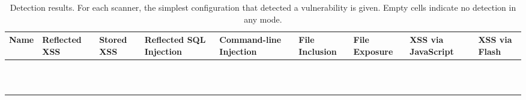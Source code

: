   \begin{table}[t]
    \centering
    {\scriptsize
      \begin{tabular}{|l|p{11ex}|p{11ex}|p{11ex}|p{11ex}|p{11ex}|p{11ex}|p{11ex}|p{11ex}|}
        \hline
        Name & Reflected XSS  & Stored XSS & \parbox[t]{11ex}{\raggedright Reflected SQL Injection} & \parbox[t]{11ex}{\raggedright Command-line Injection } & \parbox[t]{11ex}{\raggedright File Inclusion } & \parbox[t]{11ex}{\raggedright File Exposure } & \parbox[t]{11ex}{\raggedright XSS via JavaScript } & \parbox[t]{11ex}{\raggedright XSS via Flash }\\
        \hline
        \acunetix{} & \initial{} & \initial{} & \initial{} &  & \initial{} & \initial{} & \initial{} & \\
        \appscan{} & \initial{} & \initial{} & \initial{} &  & \initial{} & \initial{} &  &  \\
        \burp{} & \initial{} & \manual{} & \initial{} & \initial{} &  & \initial{} &  & \manual{} \\
        \grendelscan{} & \manual{} &  & \config{} &  &  &  &  &  \\
        \hailstorm{} & \initial{} & \config{} & \config{} &  &  &  &  & \manual{} \\
        \milescan{} & \initial{} & \manual{} & \config{} &  &  &  &  &  \\
        \nstalker{} & \initial{} & \manual{} & \manual{} &  &  & \initial{} & \initial{} & \manual{} \\
        \ntospider{} & \initial{} & \initial{} & \initial{} &  &  &  &  &  \\
        \paros{} & \initial{} & \initial{} & \config{} &  &  &  &  & \manual{} \\
        \waf{} & \initial{} & \manual{} & \initial{} &  & \initial{} &  &  & \manual{} \\
        \webinspect{} & \initial{} & \initial{} & \initial{} &  & \initial{} &  & \initial{} & \manual{} \\
        \hline
    \end{tabular}}
    \caption{Detection results. For each scanner, the simplest configuration that detected a vulnerability is given. Empty cells indicate no detection in any mode.}

\end{table}

